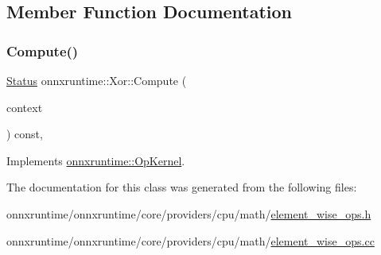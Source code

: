 \subsection{Member Function Documentation}
\mbox{\label{classonnxruntime_1_1Xor_a254212ccd78d5fec910ed95df90eb861}} 
\subsubsection{\texorpdfstring{Compute()}{Compute()}}
{\footnotesize\ttfamily \mbox{\hyperlink{classonnxruntime_1_1common_1_1Status}{Status}} onnxruntime\+::\+Xor\+::\+Compute (\begin{DoxyParamCaption}\item[{\mbox{\hyperlink{classonnxruntime_1_1OpKernelContext}{Op\+Kernel\+Context}} $\ast$}]{context }\end{DoxyParamCaption}) const\hspace{0.3cm}{\ttfamily [override]}, {\ttfamily [virtual]}}



Implements \mbox{\hyperlink{classonnxruntime_1_1OpKernel_a9eca8656a78b1b3ab9d3351a12798650}{onnxruntime\+::\+Op\+Kernel}}.



The documentation for this class was generated from the following files\+:\begin{DoxyCompactItemize}
\item 
onnxruntime/onnxruntime/core/providers/cpu/math/\mbox{\hyperlink{element__wise__ops_8h}{element\+\_\+wise\+\_\+ops.\+h}}\item 
onnxruntime/onnxruntime/core/providers/cpu/math/\mbox{\hyperlink{element__wise__ops_8cc}{element\+\_\+wise\+\_\+ops.\+cc}}\end{DoxyCompactItemize}

